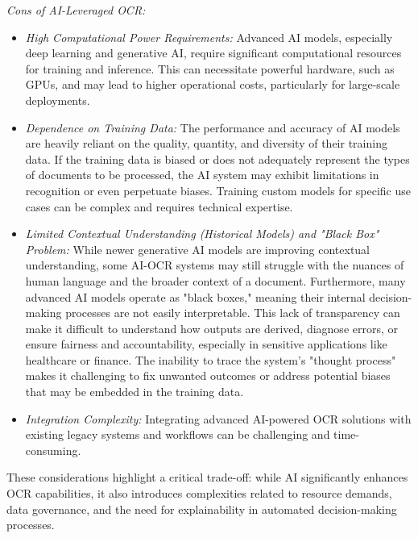 \emph{Cons of AI-Leveraged OCR:}
\begin{itemize}
    \item \emph{High Computational Power Requirements:} Advanced AI models, especially deep learning and generative AI, require significant computational resources for training and inference. \cite{AddeptoAIOCR} This can necessitate powerful hardware, such as GPUs, and may lead to higher operational costs, particularly for large-scale deployments. \cite{GithubPaddleOCR, AddeptoAIOCR}
    \item \emph{Dependence on Training Data:} The performance and accuracy of AI models are heavily reliant on the quality, quantity, and diversity of their training data. \cite{AddeptoAIOCR} If the training data is biased or does not adequately represent the types of documents to be processed, the AI system may exhibit limitations in recognition or even perpetuate biases. \cite{AddeptoAIOCR, ERICAITraining} Training custom models for specific use cases can be complex and requires technical expertise. \cite{KoncileTesseract}
    \item \emph{Limited Contextual Understanding (Historical Models) and "Black Box" Problem:} While newer generative AI models are improving contextual understanding, some AI-OCR systems may still struggle with the nuances of human language and the broader context of a document. \cite{AddeptoAIOCR} Furthermore, many advanced AI models operate as "black boxes," meaning their internal decision-making processes are not easily interpretable. \cite{AbstractaBlackBoxAI, UMDearbornBlackBoxAI} This lack of transparency can make it difficult to understand how outputs are derived, diagnose errors, or ensure fairness and accountability, especially in sensitive applications like healthcare or finance. \cite{AbstractaBlackBoxAI, UMDearbornBlackBoxAI} The inability to trace the system's "thought process" makes it challenging to fix unwanted outcomes or address potential biases that may be embedded in the training data. \cite{UMDearbornBlackBoxAI}
    \item \emph{Integration Complexity:} Integrating advanced AI-powered OCR solutions with existing legacy systems and workflows can be challenging and time-consuming. \cite{DigitalDefyndOCR, OCRToolsAPIComparison}
\end{itemize}

These considerations highlight a critical trade-off: while AI significantly enhances OCR capabilities, it also introduces complexities related to resource demands, data governance, and the need for explainability in automated decision-making processes.

